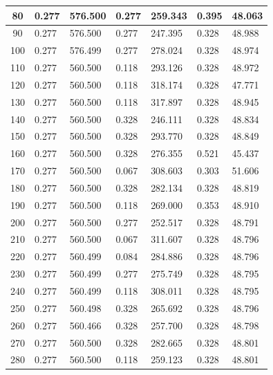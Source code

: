 \documentclass{report}
\begin{document}
\begin{minipage}{\textwidth}
\begin{longtable}{|c|l|l|l|l|l|l|}
                     80 & 0.277 & 576.500 & 0.277 & 259.343 & 0.395 & 48.063 \\ \hline
                     90 & 0.277 & 576.500 & 0.277 & 247.395 & 0.328 & 48.988 \\ \hline
                     100 & 0.277 & 576.499 & 0.277 & 278.024 & 0.328 & 48.974 \\ \hline
                     110 & 0.277 & 560.500 & 0.118 & 293.126 & 0.328 & 48.972 \\ \hline
                     120 & 0.277 & 560.500 & 0.118 & 318.174 & 0.328 & 47.771 \\ \hline
                     130 & 0.277 & 560.500 & 0.118 & 317.897 & 0.328 & 48.945 \\ \hline
                     140 & 0.277 & 560.500 & 0.328 & 246.111 & 0.328 & 48.834 \\ \hline
                     150 & 0.277 & 560.500 & 0.328 & 293.770 & 0.328 & 48.849 \\ \hline
                     160 & 0.277 & 560.500 & 0.328 & 276.355 & 0.521 & 45.437 \\ \hline
                     170 & 0.277 & 560.500 & 0.067 & 308.603 & 0.303 & 51.606 \\ \hline
                     180 & 0.277 & 560.500 & 0.328 & 282.134 & 0.328 & 48.819 \\ \hline
                     190 & 0.277 & 560.500 & 0.118 & 269.000 & 0.353 & 48.910 \\ \hline
                     200 & 0.277 & 560.500 & 0.277 & 252.517 & 0.328 & 48.791 \\ \hline
                     210 & 0.277 & 560.500 & 0.067 & 311.607 & 0.328 & 48.796 \\ \hline
                     220 & 0.277 & 560.499 & 0.084 & 284.886 & 0.328 & 48.796 \\ \hline
                     230 & 0.277 & 560.499 & 0.277 & 275.749 & 0.328 & 48.795 \\ \hline
                     240 & 0.277 & 560.499 & 0.118 & 308.011 & 0.328 & 48.795 \\ \hline
                     250 & 0.277 & 560.498 & 0.328 & 265.692 & 0.328 & 48.796 \\ \hline
                     260 & 0.277 & 560.466 & 0.328 & 257.700 & 0.328 & 48.798 \\ \hline
                     270 & 0.277 & 560.500 & 0.328 & 282.665 & 0.328 & 48.801 \\ \hline
                     280 & 0.277 & 560.500 & 0.118 & 259.123 & 0.328 & 48.801 \\ \hline

\end{longtable}
\end{minipage}
\end{document}
